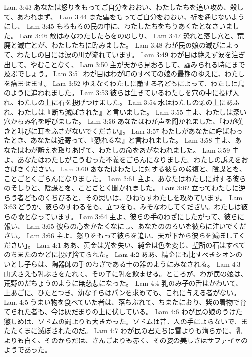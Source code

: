 Lam 3:43  あなたは怒りをもってご自分をおおい、わたしたちを追い攻め、殺して、あわれまず、
Lam 3:44  また雲をもってご自分をおおい、祈を通じないようにし、
Lam 3:45  もろもろの民の中に、わたしたちをちりあくたとなさいました。
Lam 3:46  敵はみなわたしたちをののしり、
Lam 3:47  恐れと落し穴と、荒廃と滅亡とが、わたしたちに臨みました。
Lam 3:48  わが民の娘の滅びによって、わたしの目には涙の川が流れています。
Lam 3:49  わが目は絶えず涙を注ぎ出して、やむことなく、
Lam 3:50  主が天から見おろして、顧みられる時にまで及ぶでしょう。
Lam 3:51  わが目はわが町のすべての娘の最期のゆえに、わたしを痛ませます。
Lam 3:52  ゆえなくわたしに敵する者どもによって、わたしは鳥のように追われました。
Lam 3:53  彼らは生きているわたしを穴の中に投げ入れ、わたしの上に石を投げつけました。
Lam 3:54  水はわたしの頭の上にあふれ、わたしは『断ち滅ぼされた』と言いました。
Lam 3:55  主よ、わたしは深い穴からみ名を呼びました。
Lam 3:56  あなたはわが声を聞かれました、『わが嘆きと叫びに耳をふさがないでください』。
Lam 3:57  わたしがあなたに呼ばわったとき、あなたは近寄って、『恐れるな』と言われました。
Lam 3:58  主よ、あなたはわが訴えを取りあげて、わたしの命をあがなわれました。
Lam 3:59  主よ、あなたはわたしがこうむった不義をごらんになりました。わたしの訴えをおさばきください。
Lam 3:60  あなたはわたしに対する彼らの報復と、陰謀とを、ことごとくごらんになりました。
Lam 3:61  主よ、あなたはわたしに対する彼らのそしりと、陰謀とを、ことごとく聞かれました。
Lam 3:62  立ってわたしに逆らう者どものくちびると、その思いは、ひねもすわたしを攻めています。
Lam 3:63  どうか、彼らのすわるをも、立つをも、みそなわしてください。わたしは彼らの歌となっています。
Lam 3:64  主よ、彼らの手のわざにしたがって、彼らに報い、
Lam 3:65  彼らの心をかたくなにし、あなたののろいを彼らに注いでください。
Lam 3:66  主よ、怒りをもって彼らを追い、天が下から彼らを滅ぼしてください」。
Lam 4:1  ああ、黄金は光を失い、純金は色を変じ、聖所の石はすべてのちまたのかどに投げ捨てられた。
Lam 4:2  ああ、精金にも比すべきシオンのいとし子らは、陶器師の手のわざである土の器のようにみなされる。
Lam 4:3  山犬さえも乳ぶさをたれて、その子に乳を飲ませる。ところが、わが民の娘は、荒野のだちょうのように無慈悲になった。
Lam 4:4  乳のみ子の舌はかわいて、上あごに、ひたとつき、幼な子らはパンを求めても、これに与える者がない。
Lam 4:5  うまい物を食べていた者は、落ちぶれて、ちまたにおり、紫の着物で育てられた者も、今は灰だまりの上に伏している。
Lam 4:6  わが民の娘のうけた懲しめは、ソドムの罰よりも大きかった。ソドムは昔、人の手によらないで、またたくまに滅ぼされたのだ。
Lam 4:7  わが民の君たちは雪よりも清らかに、乳よりも白く、そのからだは、さんごよりも赤く、その姿の美しさはサファイヤのようであった。
